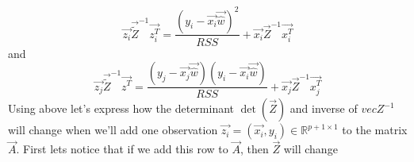 \begin{equation}
    \vec{z_i} \vec{\tilde{Z}}^{-1} \vec{z_i^T} = \dfrac{ ( y_i - \vec{x_i}\vec{\hat{w}} )^2 }{RSS}  + \vec{x_i}\vec{Z}^{-1}\vec{x_i^T}
\end{equation}
and
\begin{equation}
    \vec{z_j} \vec{\tilde{Z}}^{-1} \vec{z^T} = \dfrac{ ( y_j - \vec{x_j}\vec{\hat{w}} ) ( y_i - \vec{x_i}\vec{\hat{w}} ) }{RSS}  + \vec{x_j}\vec{Z}^{-1}\vec{x_j^T}
\end{equation}
Using above let's express how the determinant $\det(\vec{Z})$ and inverse of $vec{Z}^{-1}$ will change when we'll add one observation $\vec{z_i} = (\vec{x_i}, y_i) \in \mathbb{R}^{p+1 \times 1} $ to the matrix $\vec{A}$. First lets notice that if we add this row to $\vec{A}$, then  $\vec{Z}$ will change 


